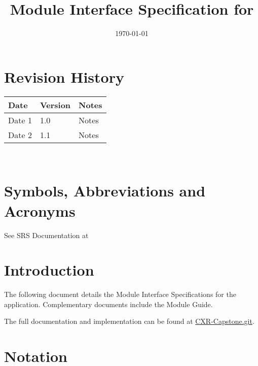 \documentclass[12pt, titlepage]{article}
\begin{document}
\title{Module Interface Specification for \progname{}}

\author{\authname}

\date{\today}

\maketitle


\section{Revision History}

\begin{tabularx}{\textwidth}{p{3cm}p{2cm}X}
\toprule {\bf Date} & {\bf Version} & {\bf Notes}\\
\midrule
Date 1 & 1.0 & Notes\\
Date 2 & 1.1 & Notes\\
\bottomrule
\end{tabularx}

~\newpage

\section{Symbols, Abbreviations and Acronyms}

See SRS Documentation at 


\newpage

\tableofcontents

\newpage


\section{Introduction}

The following document details the Module Interface Specifications for the
\projname application. Complementary documents include the Module Guide.

The full documentation and implementation can be found at \href{https://github.com/RezaJodeiri/CXR-Capstone}{CXR-Capstone.git}.

\section{Notation}
\end{document}
